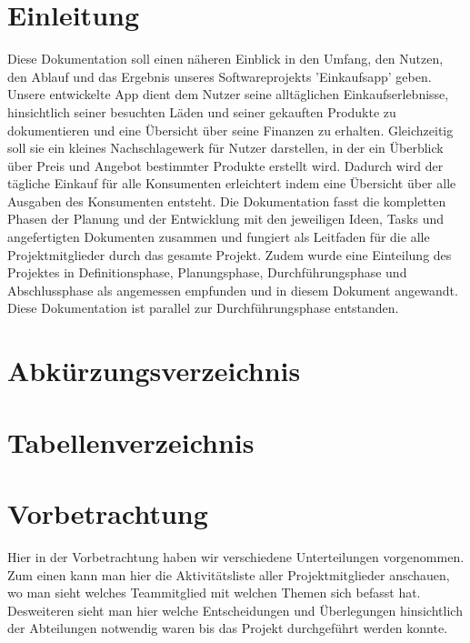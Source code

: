 \documentclass[12pt,a4paper]{article}
\begin{document}
\section*{Einleitung}
Diese Dokumentation soll einen näheren Einblick in den Umfang, 
den Nutzen, den Ablauf und das Ergebnis unseres Softwareprojekts 'Einkaufsapp' geben.  
\newline
Unsere entwickelte App dient dem Nutzer seine alltäglichen Einkaufserlebnisse, hinsichtlich seiner besuchten Läden und seiner gekauften Produkte zu dokumentieren und eine Übersicht über seine Finanzen zu erhalten.
Gleichzeitig soll sie ein kleines Nachschlagewerk für Nutzer darstellen, in der ein Überblick über Preis und Angebot bestimmter Produkte erstellt wird. 
Dadurch wird der tägliche Einkauf für alle Konsumenten erleichtert indem eine Übersicht über alle Ausgaben des Konsumenten entsteht.
\newline
Die Dokumentation fasst die kompletten Phasen der Planung und der Entwicklung mit den jeweiligen Ideen, Tasks und angefertigten Dokumenten zusammen und fungiert als Leitfaden für die alle Projektmitglieder durch das gesamte Projekt.
\newline
Zudem wurde eine Einteilung des Projektes in Definitionsphase, Planungsphase, Durchführungsphase und Abschlussphase als angemessen empfunden und in diesem Dokument angewandt.
Diese Dokumentation ist parallel zur Durchführungsphase entstanden.

\newpage
\section*{Abkürzungsverzeichnis}
\newpage
\section*{Tabellenverzeichnis}

\section{Vorbetrachtung}
Hier in der Vorbetrachtung haben wir verschiedene Unterteilungen vorgenommen. 
Zum einen kann man hier die Aktivitätsliste aller Projektmitglieder anschauen,  wo man sieht welches Teammitglied mit welchen Themen sich befasst hat. 
Desweiteren sieht man hier welche Entscheidungen und Überlegungen hinsichtlich der Abteilungen notwendig waren bis das Projekt durchgeführt werden konnte.
\end{document}
